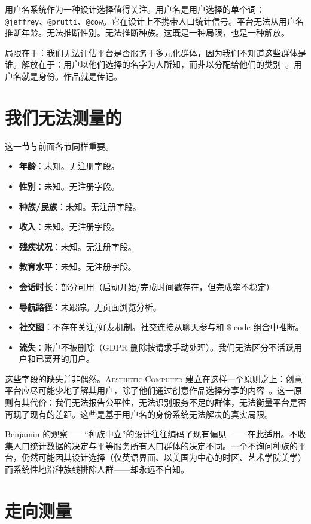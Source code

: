 \documentclass[10pt,letterpaper,twocolumn]{article}
\newcommand{\ac}{\textsc{Aesthetic.Computer}}
\begin{document}
用户名系统作为一种设计选择值得关注。用户名是用户选择的单个词：\texttt{@jeffrey}、\texttt{@prutti}、\texttt{@cow}。它在设计上不携带人口统计信号。平台无法从用户名推断年龄。无法推断性别。无法推断种族。这既是一种局限，也是一种解放。

局限在于：我们无法评估平台是否服务于多元化群体，因为我们不知道这些群体是谁。解放在于：用户以他们选择的名字为人所知，而非以分配给他们的类别~\citep{costanzachock2020design}。用户名就是身份。作品就是传记。

\section{我们无法测量的}

这一节与前面各节同样重要。

\begin{itemize}
  \item \textbf{年龄}：未知。无注册字段。
  \item \textbf{性别}：未知。无注册字段。
  \item \textbf{种族/民族}：未知。无注册字段。
  \item \textbf{收入}：未知。无注册字段。
  \item \textbf{残疾状况}：未知。无注册字段。
  \item \textbf{教育水平}：未知。无注册字段。
  \item \textbf{会话时长}：部分可用（启动开始/完成时间戳存在，但完成率不稳定）
  \item \textbf{导航路径}：未跟踪。无页面浏览分析。
  \item \textbf{社交图}：不存在关注/好友机制。社交连接从聊天参与和 \$-code 组合中推断。
  \item \textbf{流失}：账户不被删除（GDPR 删除按请求手动处理）。我们无法区分不活跃用户和已离开的用户。
\end{itemize}

这些字段的缺失并非偶然。\ac{} 建立在这样一个原则之上：创意平台应尽可能少地了解其用户，除了他们通过创意作品选择分享的内容~\citep{illich1973tools}。这一原则有其代价：我们无法报告公平性，无法识别服务不足的群体，无法衡量平台是否再现了现有的差距。这些是基于用户名的身份系统无法解决的真实局限。

Benjamin 的观察——``种族中立''的设计往往编码了现有偏见~\citep{benjamin2019race}——在此适用。不收集人口统计数据的决定与平等服务所有人口群体的决定不同。一个不询问种族的平台，仍然可能因其设计选择（仅英语界面、以美国为中心的时区、艺术学院美学）而系统性地沿种族线排除人群——却永远不自知。

\section{走向测量}
\end{document}
